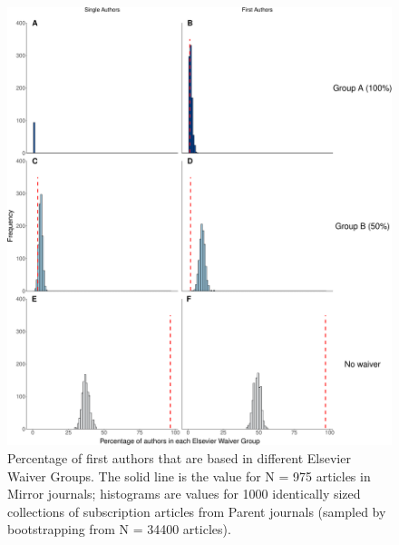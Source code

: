\documentclass[
  english,
  man]{apa6}
\begin{document}
\begin{figure}

{\centering \includegraphics{Smith_etal_QSS_files/figure-latex/Fig6-1} 

}

\caption{Percentage of first authors that are based in different Elsevier Waiver Groups. The solid line is the value for N =  975  articles in Mirror journals; histograms are values for 1000 identically sized collections of subscription articles from Parent journals (sampled by bootstrapping from N =  34400  articles).}\label{fig:Fig6}
\end{figure}
\end{document}
